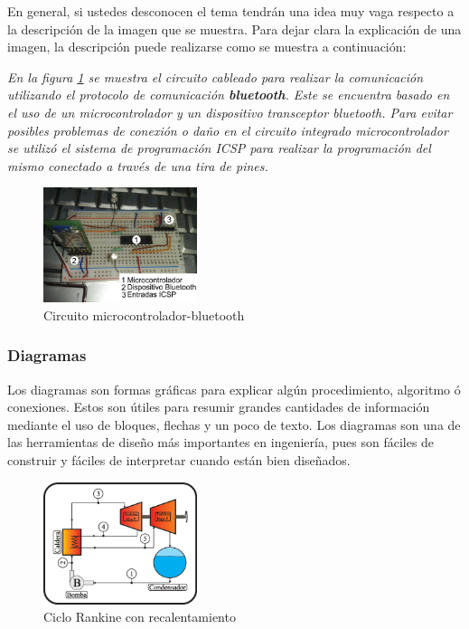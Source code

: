 En general, si ustedes desconocen el tema tendrán una idea muy vaga respecto a la descripción de la imagen que se muestra. Para dejar clara la explicación de una imagen, la descripción puede realizarse como se muestra a continuación:

\emph{En la figura \ref{fig1_102} se muestra el circuito cableado para realizar la comunicación utilizando el protocolo de comunicación \textbf{bluetooth}. Este se encuentra basado en el uso de un microcontrolador y un dispositivo transceptor bluetooth. Para evitar posibles problemas de conexión o daño en el circuito integrado  microcontrolador se utilizó el sistema de programación ICSP para realizar la programación del mismo conectado a través de una tira de pines.}

\begin{figure}[!htbp]
        \centering
        \includegraphics[width=0.4\textwidth]{images/imagenexplicada.eps}
        \caption{\footnotesize{Circuito microcontrolador-bluetooth}}
        \label{fig1_102}
\end{figure}

\subsubsection{Diagramas}

Los diagramas son formas gráficas para explicar algún procedimiento, algoritmo ó conexiones. Estos son útiles para resumir grandes cantidades de información mediante el uso de bloques, flechas y un poco de texto. Los diagramas son una de las herramientas de diseño más importantes en ingeniería, pues son fáciles de construir y fáciles de interpretar cuando están bien diseñados.

\begin{figure}[!htbp]
        \centering
        \includegraphics[width=0.4\textwidth]{images/rankine_rec.eps}
        \caption{\footnotesize{Ciclo Rankine con recalentamiento}}
        \label{fig1_103}
\end{figure}


